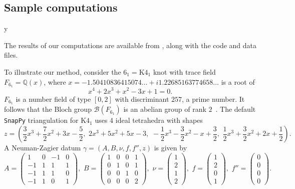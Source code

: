 \documentclass[12pt]{amsart}
\theoremstyle{definition}
\def\printname#1{
        \if\draft y
                \smash{\makebox[0pt]{\hspace{-0.5in}
                        \raisebox{8pt}{\tt\tiny #1}}}
        \fi
}
\def\lbl#1{\label{#1}\printname{#1}}
\def\BQ{\mathbb Q}
\def\ga{\gamma}
\def\calB{\mathcal{B}}
\def\calB{\mathcal{B}}
\begin{document}
\subsection{Sample computations}
\lbl{sub.sample}

The results of our computations are available from \cite{nloop-compute},
along with the code and data files.

To illustrate our method, consider the $6_1=\mathrm{K4}_1$ knot with trace
field $F_{6_1}=\BQ(x)$, where $x=-1.50410836415074\dots 
+ i 1.22685163774658\dots $ 
is a root of
$$
x^4 + 2 x^3 + x^2 - 3 x + 1 = 0.
$$
$F_{6_1}$ is a number field of type $[0,2]$ with discriminant $257$, a prime
number. It follows that the Bloch group $\calB(F_{6_1})$ is an abelian group
of rank $2$~\cite{suslin,zi}. The default \texttt{SnapPy} 
triangulation for $\mathrm{K4}_1$ uses 4 ideal tetrahedra with shapes 
\small{
$$
z=\left(\frac{3}{2} x^{3} + \frac{7}{2} x^{2} + 3 x - \frac{5}{2}, \,\,
2 x^{3} + 5 x^{2} + 5 x - 3, \,\,
-\frac{1}{2} x^{3} - \frac{3}{2} x^{2} - x + \frac{3}{2}, \,\,
\frac{1}{2} x^{3} + \frac{3}{2} x^{2} + 2 x + \frac{1}{2} \right).
$$
}
A Neuman-Zagier datum $\ga=(A,B,\nu,f,f'',z)$ is given by
$$
A = \left(\begin{array}{rrrr}
1 & 0 & -1 & 0 \\
-1 & 1 & 1 & 1 \\
-1 & 1 & 1 & 0 \\
-1 & 1 & 0 & 1
\end{array}\right), \,\,
B = \left(\begin{array}{rrrr}
1 & 0 & 0 & 1 \\
0 & 1 & 0 & 1 \\
0 & 0 & 1 & 0 \\
0 & 0 & 0 & 2
\end{array}\right), \,\, 
\nu = \left(\begin{array}{r} 
1 \\ 2 \\ 1 \\ 2 
\end{array}\right), \,\, 
f = \left(\begin{array}{r} 
1 \\ 2 \\ 0 \\ 1
\end{array}\right), \,\, 
f'' = \left(\begin{array}{r} 
0 \\ 0 \\ 0 \\ 0
\end{array}\right).
$$
\end{document}
